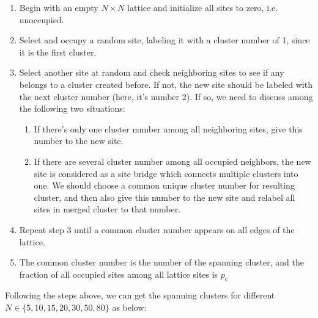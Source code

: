 \documentclass{article}
\begin{document}
\begin{enumerate}
\item Begin with an empty $N\times N$ lattice and initialize all sites to zero, i.e. unoccupied.
\item Select and occupy a random site, labeling it with a cluster number of 1, since it is the first cluster.
\item Select another site at random and check neighboring sites to see if any belongs to a cluster created before. If not, the new site should be labeled with the next cluster number (here, it's number 2). If so, we need to discuss among the following two situations:

\begin{enumerate}
\item If there's only one cluster number among all neighboring sites, give this number to the new site.
\item If there are several cluster number among all occupied neighbors, the new site is considered as a site bridge which connects multiple clusters into one. We should choose a common unique cluster number for resulting cluster, and then also give this number to the new site and relabel all sites in merged cluster to that number.
\end{enumerate}

\item Repeat step 3 until a common cluster number appears on all edges of the lattice.
\item The common cluster number is the number of the spanning cluster, and the fraction of all occupied sites among all lattice sites is $p_c$
\end{enumerate}

Following the steps above, we can get the spanning clusters for different $N\in\{5, 10, 15, 20, 30, 50, 80\}$ as below:
\end{document}
